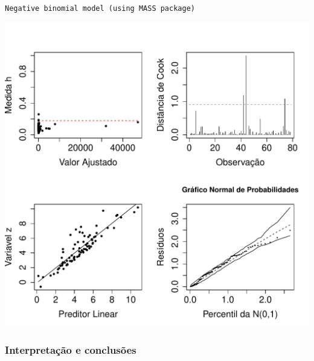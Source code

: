 \documentclass[12pt,a4paper]{article}\usepackage[]{graphicx}\usepackage[]{color}
\makeatletter
\def\maxwidth{ %
  \ifdim\Gin@nat@width>\linewidth
    \linewidth
  \else
    \Gin@nat@width
  \fi
}
\newenvironment{kframe}{%
 \def\at@end@of@kframe{}%
 \ifinner\ifhmode%
  \def\at@end@of@kframe{\end{minipage}}%
  \begin{minipage}{\columnwidth}%
 \fi\fi%
 \def\FrameCommand##1{\hskip\@totalleftmargin \hskip-\fboxsep
 \colorbox{shadecolor}{##1}\hskip-\fboxsep
     \hskip-\linewidth \hskip-\@totalleftmargin \hskip\columnwidth}%
 \MakeFramed {\advance\hsize-\width
   \@totalleftmargin\z@ \linewidth\hsize
   \@setminipage}}%
 {\par\unskip\endMakeFramed%
 \at@end@of@kframe}
\newenvironment{knitrout}{}{} %
\makeatother
\begin{document}
\begin{knitrout}
\color{fgcolor}\begin{kframe}
\begin{verbatim}
Negative binomial model (using MASS package) 
\end{verbatim}
\end{kframe}
\includegraphics[width=\maxwidth]{figure/unnamed-chunk-16-1} 

\end{knitrout}
\subsubsection{\textbf{Interpretação e conclusões}}
\end{document}
